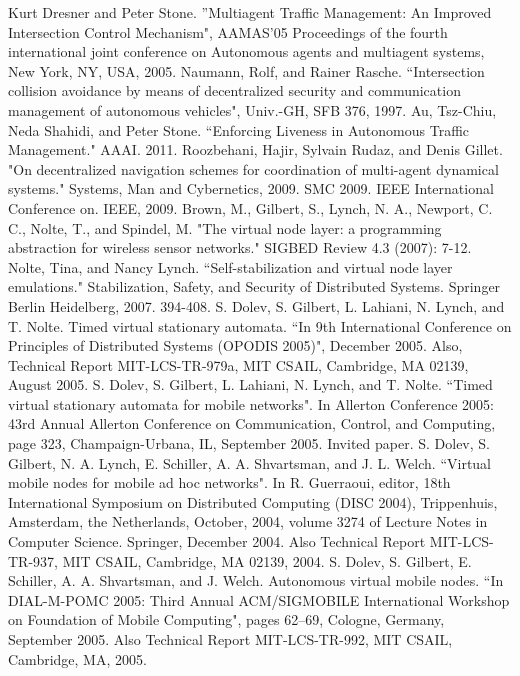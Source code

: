 \documentclass[12pt]{article}
\begin{document}
\begin{thebibliography}{9}

Kurt Dresner and Peter Stone. ''Multiagent Traffic Management: An Improved Intersection
Control Mechanism", AAMAS'05 Proceedings of the fourth international joint conference on Autonomous agents and multiagent systems, New York, NY, USA, 2005.
Naumann, Rolf, and Rainer Rasche. ``Intersection collision avoidance by means of decentralized security and communication management of autonomous vehicles", Univ.-GH, SFB 376, 1997.
Au, Tsz-Chiu, Neda Shahidi, and Peter Stone. ``Enforcing Liveness in Autonomous Traffic Management." AAAI. 2011.
Roozbehani, Hajir, Sylvain Rudaz, and Denis Gillet. "On decentralized navigation schemes for coordination of multi-agent dynamical systems." Systems, Man and Cybernetics, 2009. SMC 2009. IEEE International Conference on. IEEE, 2009.
Brown, M., Gilbert, S., Lynch, N. A., Newport, C. C., Nolte, T., and Spindel, M. "The virtual node layer: a programming abstraction for wireless sensor networks." SIGBED Review 4.3 (2007): 7-12.
Nolte, Tina, and Nancy Lynch. ``Self-stabilization and virtual node layer emulations." Stabilization, Safety, and Security of Distributed Systems. Springer Berlin Heidelberg, 2007. 394-408.
S. Dolev, S. Gilbert, L. Lahiani, N. Lynch, and
T. Nolte. Timed virtual stationary automata. ``In 9th International Conference on Principles of Distributed Systems (OPODIS 2005)", December 2005. Also, Technical Report MIT-LCS-TR-979a, MIT CSAIL, Cambridge, MA 02139, August 2005.
S. Dolev, S. Gilbert, L. Lahiani, N. Lynch, and
T. Nolte. ``Timed virtual stationary automata for mobile networks". In Allerton Conference 2005: 43rd Annual Allerton Conference on Communication, Control, and Computing, page 323, Champaign-Urbana, IL, September 2005. Invited paper.
S. Dolev, S. Gilbert, N. A. Lynch, E. Schiller, A. A. Shvartsman, and J. L. Welch. ``Virtual mobile nodes for mobile ad hoc networks". In R. Guerraoui, editor, 18th International Symposium on Distributed Computing (DISC 2004), Trippenhuis, Amsterdam, the Netherlands, October, 2004, volume 3274 of Lecture Notes in Computer Science. Springer, December 2004. Also Technical Report MIT-LCS-TR-937, MIT CSAIL, Cambridge, MA 02139, 2004.
S. Dolev, S. Gilbert, E. Schiller, A. A. Shvartsman, and J. Welch. Autonomous virtual mobile nodes. ``In DIAL-M-POMC 2005: Third Annual ACM/SIGMOBILE International Workshop on Foundation of Mobile Computing", pages 62–69, Cologne, Germany, September 2005. Also Technical Report MIT-LCS-TR-992, MIT CSAIL, Cambridge, MA, 2005.
\end{thebibliography}
\end{document}
